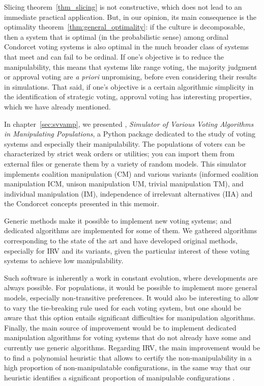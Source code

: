 Slicing theorem~\ref{thm_slicing} is not constructive, which does not lead to an immediate practical application. But, in our opinion, its main consequence is the optimality theorem~\ref{thm:general_optimality}: if the culture is decomposable, then a system that is optimal (in the probabilistic sense) among ordinal Condorcet voting systems is also optimal in the much broader class of systems that meet \cminf{} and can fail to be ordinal. If one's objective is to reduce the manipulability, this means that systems like range voting, the majority judgment or approval voting are \emph{a priori} unpromising, before even considering their results in simulations. That said, if one's objective is a certain algorithmic simplicity in the identification of strategic voting, approval voting has interesting properties, which we have already mentioned.

\medskip
In chapter~\ref{sec:svvamp}, we presented \svvamp{}, \emph{Simulator of Various Voting Algorithms in Manipulating Populations}, a Python package dedicated to the study of voting systems and especially their manipulability. The populations of voters can be characterized by strict weak orders or utilities; you can import them from external files or generate them by a variety of random models. This simulator implements coalition manipulation (CM) and various variants (informed coalition manipulation ICM, unison manipulation UM, trivial manipulation TM), and individual manipulation (IM), independence of irrelevant alternatives (IIA) and the Condorcet concepts presented in this memoir.

Generic methods make it possible to implement new voting systems; and dedicated algorithms are implemented for some of them. We gathered algorithms corresponding to the state of the art and have developed original methods, especially for IRV and its variants, given the particular interest of these voting systems to achieve low manipulability.

Such software is inherently a work in constant evolution, where developments are always possible. For populations, it would be possible to implement more general models, especially non-transitive preferences. It would also be interesting to allow to vary the tie-breaking rule used for each voting system, but one should be aware that this option entails significant difficulties for manipulation algorithms. Finally, the main source of improvement would be to implement dedicated manipulation algorithms for voting systems that do not already have some and currently use generic algorithms. Regarding IRV, the main improvement would be to find a polynomial heuristic that allows to certify the non-manipulability in a high proportion of non-manipulatable configurations, in the same way that our heuristic identifies a significant proportion of manipulable configurations .

